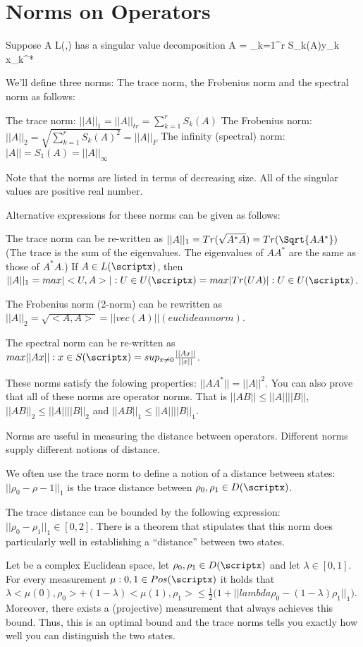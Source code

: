 
\section{Norms on Operators}
Suppose A \in L(\scriptx,\scripty) has a singular value decomposition A = \sum_{k=1}^r S_k(A)y_k x_k^*

We'll define three norms: The trace norm, the Frobenius norm and the spectral norm as follows:

The trace norm: $||A||_1 = ||A||_{tr} = \sum_{k=1}^r S_k(A)$
The Frobenius norm: $||A||_2 = \sqrt{\sum_{k=1}^r S_k(A)^2} = ||A||_F$
The infinity (spectral) norm: $|A|| = S_1(A) =||A||_\infty$

Note that the norms are listed in terms of decreasing size. All of the singular values are positive real number.

Alternative expressions for these norms can be given as follows:

The trace norm can be re-written as $||A||_1 = Tr(\sqrt{A^*A}) = Tr(\Sqrt{AA^*})$ (The trace is the sum of the eigenvalues. The eigenvalues of $AA^*$ are the same as those of $A^*A$.)
If $A \in L(\scriptx)$, then $||A||_1 = max{|<U,A>| : U \in U(\scriptx)} = max{|Tr(UA)|: U \in U(\scriptx)}$.

The Frobenius norm (2-norm) can be rewritten as $||A||_2 = \sqrt{<A,A>} = ||vec(A)|| (euclidean norm)$.

The spectral norm can be re-written as $max{||Ax||: x \in S(\scriptx)} = sup_{x \ne 0} \frac{||Ax||}{||x||}$.

These norms satisfy the folowing properties: $||AA^*|| = ||A||^2$. You can also prove that all of these norms are operator norms. That is $||AB|| \le ||A|| ||B||$, $||AB||_2 \le ||A|| ||B||_2$ and $||AB||_1 \le ||A|| ||B||_1$.

Norms are useful in measuring the distance between operators. Different norms supply different notions of distance.

We often use the trace norm to define a notion of a distance between states: $||\rho_0 - \rho-1||_1$ is the trace distance between $\rho_0, \rho_1 \in D(\scriptx)$.

The trace distance can be bounded by the following expression: $||\rho_0 - \rho_1||_1 \in [0,2]$. There is a theorem that stipulates that this norm does 
particularly well in establishing a ``distance'' between two states.

\begin{theorem}
	Let \scriptx be a complex Euclidean space, let $\rho_0, \rho_1 \in D(\scriptx)$ and let $\lambda \in [0,1]$. 
	For every measurement $\mu: {0,1} \in Pos(\scriptx)$ it holds that $\lambda <\mu(0),\rho_0> + (1-\lambda)<\mu(1),\rho_1> \le \frac{1}{2}\big( 1 + ||lambda \rho_0 - (1-\lambda)\rho_1||_1 \big)$. Moreover, there exists a (projective) measurement that always achieves this bound. Thus, this is an optimal bound and the trace norms tells you exactly how well you can distinguish the two states.
\end{theorem}

